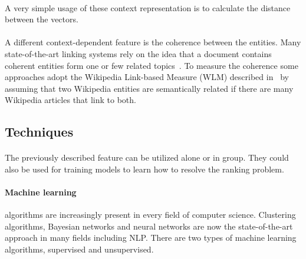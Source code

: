 \paragraph{} A very simple usage of these context representation is to calculate the distance between the vectors.

\paragraph{} A different context-dependent feature is the coherence between the entities. Many state-of-the-art linking systems rely on the idea that a document contains coherent entities form one or few related topics~\cite{hoffart2011robust}. To measure the coherence some approaches adopt the Wikipedia Link-based Measure (WLM) described in~\cite{milne2008learning} by assuming that two Wikipedia entities are semantically related if there are many Wikipedia articles that link to both.

\subsection{Techniques}
\paragraph{} The previously described feature can be utilized alone or in group. They could also be used for training models to learn how to resolve the ranking problem.

\paragraph{Machine learning} algorithms are increasingly present in every field of computer science. Clustering algorithms, Bayesian networks and neural networks are now the state-of-the-art approach in many fields including NLP. There are two types of machine learning algorithms, supervised and unsupervised.

